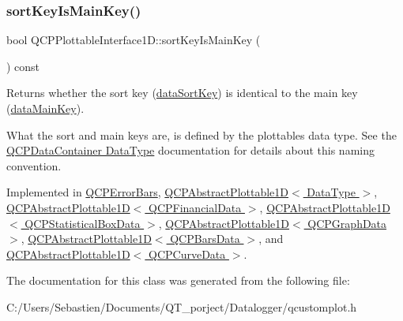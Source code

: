 \mbox{\label{class_q_c_p_plottable_interface1_d_a229e65e7ab968dd6cd0e259fa504b79d}} 
\subsubsection{\texorpdfstring{sort\+Key\+Is\+Main\+Key()}{sortKeyIsMainKey()}}
{\footnotesize\ttfamily bool Q\+C\+P\+Plottable\+Interface1\+D\+::sort\+Key\+Is\+Main\+Key (\begin{DoxyParamCaption}{ }\end{DoxyParamCaption}) const\hspace{0.3cm}{\ttfamily [pure virtual]}}

Returns whether the sort key (\hyperlink{class_q_c_p_plottable_interface1_d_afdc92f9f01e7e35f2e96b2ea9dc14ae7}{data\+Sort\+Key}) is identical to the main key (\hyperlink{class_q_c_p_plottable_interface1_d_a2bd60daaac046945fead558cbd83cf73}{data\+Main\+Key}).

What the sort and main keys are, is defined by the plottable\textquotesingle{}s data type. See the \hyperlink{class_q_c_p_data_container_qcpdatacontainer-datatype}{Q\+C\+P\+Data\+Container Data\+Type} documentation for details about this naming convention. 

Implemented in \hyperlink{class_q_c_p_error_bars_aa00fcef7b0cb5c54bafe32ab4b16e674}{Q\+C\+P\+Error\+Bars}, \hyperlink{class_q_c_p_abstract_plottable1_d_a022e8905f5a667d8379493d6a037e79f}{Q\+C\+P\+Abstract\+Plottable1\+D$<$ Data\+Type $>$}, \hyperlink{class_q_c_p_abstract_plottable1_d_a022e8905f5a667d8379493d6a037e79f}{Q\+C\+P\+Abstract\+Plottable1\+D$<$ Q\+C\+P\+Financial\+Data $>$}, \hyperlink{class_q_c_p_abstract_plottable1_d_a022e8905f5a667d8379493d6a037e79f}{Q\+C\+P\+Abstract\+Plottable1\+D$<$ Q\+C\+P\+Statistical\+Box\+Data $>$}, \hyperlink{class_q_c_p_abstract_plottable1_d_a022e8905f5a667d8379493d6a037e79f}{Q\+C\+P\+Abstract\+Plottable1\+D$<$ Q\+C\+P\+Graph\+Data $>$}, \hyperlink{class_q_c_p_abstract_plottable1_d_a022e8905f5a667d8379493d6a037e79f}{Q\+C\+P\+Abstract\+Plottable1\+D$<$ Q\+C\+P\+Bars\+Data $>$}, and \hyperlink{class_q_c_p_abstract_plottable1_d_a022e8905f5a667d8379493d6a037e79f}{Q\+C\+P\+Abstract\+Plottable1\+D$<$ Q\+C\+P\+Curve\+Data $>$}.



The documentation for this class was generated from the following file\+:\begin{DoxyCompactItemize}
\item 
C\+:/\+Users/\+Sebastien/\+Documents/\+Q\+T\+\_\+porject/\+Datalogger/qcustomplot.\+h\end{DoxyCompactItemize}
